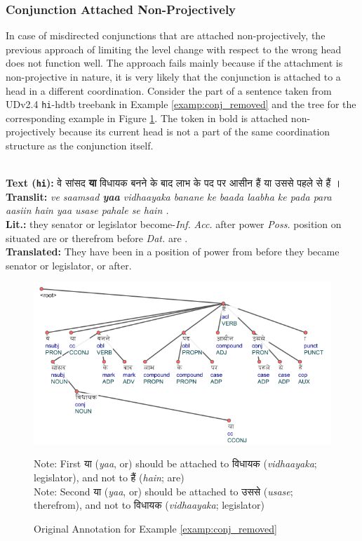 \subsubsection{Conjunction Attached Non-Projectively}

In case of misdirected conjunctions that are attached non-projectively, the previous approach of limiting the level change with respect to the wrong head does not function well. The approach fails mainly because if the attachment is non-projective in nature, it is very likely that the conjunction is attached to a head in a different coordination. Consider the part of a sentence taken from UDv2.4 \verb|hi|-hdtb treebank in Example \ref{examp:conj_removed} and the tree for the corresponding example in Figure \ref{fig:conj_removed-wrong}. The token in bold is attached non-projectively because its current head is not a part of the same coordination structure as the conjunction itself.

\begin{example}
\label{examp:conj_removed}
\textbf{ }\\
\textbf{Text (\texttt{hi}):} \texthindi{वे सांसद \textbf{या} विधायक बनने के बाद लाभ के पद पर आसीन हैं या उससे पहले से हैं ।} \\
\textbf{Translit:} \textit{ve saamsad \textbf{yaa} vidhaayaka banane ke baada laabha ke pada para aasiin hain yaa usase pahale se hain .}\\
\textbf{Lit.:} they senator or legislator become-\textit{Inf.} \textit{Acc.} after power \textit{Poss.} position on situated are or therefrom before \textit{Dat.} are .\\
\textbf{Translated:} They have been in a position of power from before they became senator or legislator, or after.
\end{example}

\begin{figure}[H]
  \centering
  \includegraphics[scale=0.85]{img/removed-conj-wrong.png}
  \caption{Original Annotation for Example \ref{examp:conj_removed}}
  Note: First \texthindi{या} (\textit{yaa}, or) should be attached to \texthindi{विधायक} (\textit{vidhaayaka}; legislator), and not to \texthindi{हैं} (\textit{hain}; are)\\
  Note: Second \texthindi{या} (\textit{yaa}, or) should be attached to \texthindi{उससे} (\textit{usase}; therefrom), and not to \texthindi{विधायक} (\textit{vidhaayaka}; legislator)
  \label{fig:conj_removed-wrong}
\end{figure}

